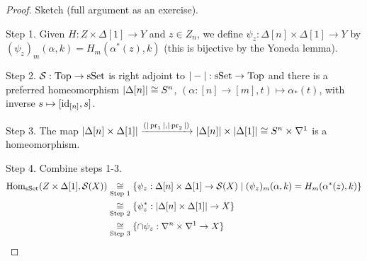 \begin{proof}
Sketch (full argument as an exercise).

Step 1. Given $H:Z\times\Delta[1]\to Y$ and $z\in Z_n$, we define $\psi_z:\Delta[n]\times\Delta[1]\to Y$ by $(\psi_z)_m(\alpha,k)=H_m(\alpha^*(z),k)$ (this is bijective by the Yoneda lemma).

Step 2. $\mathcal{S}:{\mathrm{Top}}\to{\mathrm{sSet}}$ is right adjoint to $|-|:{\mathrm{sSet}}\to{\mathrm{Top}}$ and there is a preferred homeomorphism $|\Delta[n]|\cong S^n$, $(\alpha:[n]\to[m],t)\mapsto\alpha_*(t)$, with inverse $s\mapsto[\operatorname{id}_{[n]},s]$.

Step 3. The map $|\Delta[n]\times\Delta[1]|\xrightarrow{(|\operatorname{pr}_1|,|\operatorname{pr}_2|)}|\Delta[n]|\times|\Delta[1]|\cong S^n\times\nabla^1$ is a homeomorphism.

Step 4. Combine steps 1-3.
\begin{align*}
    \operatorname{Hom}_{\mathrm{sSet}}(Z\times\Delta[1],\mathcal{S}(X))&\underset{\text{Step 1}}{\cong}\{\psi_z:\Delta[n]\times\Delta[1]\to\mathcal{S}(X)\mid(\psi_z)_m(\alpha,k)=H_m(\alpha^*(z),k)\} \\
    &\underset{\text{Step 2}}{\cong}\{\psi_z^*:|\Delta[n]\times\Delta[1]|\to X\} \\
    &\underset{\text{Step 3}}{\cong}\{\cap\psi_z:\nabla^n\times\nabla^1\to X\}
\end{align*}

\end{proof}

